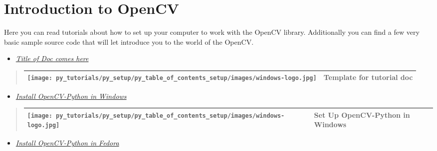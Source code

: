 \documentclass[letterpaper,10pt,english]{sphinxmanual}
\begin{document}
\section{Introduction to OpenCV}
\label{py_tutorials/py_setup/py_table_of_contents_setup/py_table_of_contents_setup:table-of-content-setup}\label{py_tutorials/py_setup/py_table_of_contents_setup/py_table_of_contents_setup:introduction-to-opencv}\label{py_tutorials/py_setup/py_table_of_contents_setup/py_table_of_contents_setup::doc}
Here you can read tutorials about how to set up your computer to work with the OpenCV library.
Additionally you can find a few very basic sample source code that will let introduce you to the
world of the OpenCV.
\begin{itemize}
\item {} 
{\hyperref[py_tutorials/py_setup/py_tutorial_template/py_tutorial_template:tutorial-template]{\emph{Title of Doc comes here}}}

\end{itemize}
\begin{quote}

\begin{tabulary}{\linewidth}{m{100pt} m{300pt}}
\hline

\texttt{[image: py\_tutorials/py\_setup/py\_table\_of\_contents\_setup/images/windows-logo.jpg]}
 & 
Template for tutorial doc
\\\hline
\end{tabulary}

\end{quote}
\begin{itemize}
\item {} 
{\hyperref[py_tutorials/py_setup/py_setup_in_windows/py_setup_in_windows:install-opencv-python-in-windows]{\emph{Install OpenCV-Python in Windows}}}

\end{itemize}
\begin{quote}

\begin{tabulary}{\linewidth}{m{100pt} m{300pt}}
\hline

\texttt{[image: py\_tutorials/py\_setup/py\_table\_of\_contents\_setup/images/windows-logo.jpg]}
 & 
Set Up OpenCV-Python in Windows
\\\hline
\end{tabulary}

\end{quote}
\begin{itemize}
\item {} 
{\hyperref[py_tutorials/py_setup/py_setup_in_fedora/py_setup_in_fedora:install-opencv-python-in-fedora]{\emph{Install OpenCV-Python in Fedora}}}

\end{itemize}
\end{document}
